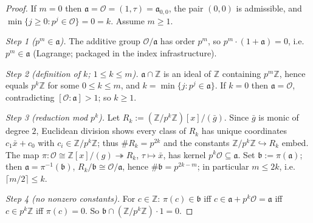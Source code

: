 \begin{proof}
  If $m = 0$ then $\mathfrak{a} = \mathcal{O} = (1, \tau) = \mathfrak{a}_{0,0}$,
  the pair $(0, 0)$ is admissible, and
  $\min\{j \ge 0 : p^j \in \mathcal{O}\} = 0 = k$. Assume $m \ge 1$.

  \emph{Step 1 ($p^m \in \mathfrak{a}$).} The additive group
  $\mathcal{O}/\mathfrak{a}$ has order $p^m$, so $p^m\cdot(1 + \mathfrak{a}) = 0$,
  i.e.\ $p^m \in \mathfrak{a}$ (Lagrange; packaged in the index infrastructure).

  \emph{Step 2 (definition of $k$; $1 \le k \le m$).}
  $\mathfrak{a} \cap \mathbb{Z}$ is an ideal of $\mathbb{Z}$ containing
  $p^m\mathbb{Z}$, hence equals $p^k\mathbb{Z}$ for some $0 \le k \le m$, and
  $k = \min\{j : p^j \in \mathfrak{a}\}$. If $k = 0$ then $\mathfrak{a} = \mathcal{O}$,
  contradicting $[\mathcal{O}:\mathfrak{a}] > 1$; so $k \ge 1$.

  \emph{Step 3 (reduction mod $p^k$).} Let
  $R_k := (\mathbb{Z}/p^k\mathbb{Z})[x]/(\bar g)$. Since $\bar g$ is monic of
  degree $2$, Euclidean division shows every class of $R_k$ has unique coordinates
  $c_1\bar x + c_0$ with $c_i \in \mathbb{Z}/p^k\mathbb{Z}$; thus
  $\# R_k = p^{2k}$ and the constants $\mathbb{Z}/p^k\mathbb{Z} \hookrightarrow R_k$
  embed. The map $\pi : \mathcal{O} \cong \mathbb{Z}[x]/(g) \twoheadrightarrow R_k$,
  $\tau \mapsto \bar x$, has kernel $p^k\mathcal{O} \subseteq \mathfrak{a}$. Set
  $\mathfrak{b} := \pi(\mathfrak{a})$; then $\mathfrak{a} = \pi^{-1}(\mathfrak{b})$,
  $R_k/\mathfrak{b} \cong \mathcal{O}/\mathfrak{a}$, hence
  $\#\mathfrak{b} = p^{2k-m}$; in particular $m \le 2k$, i.e.\ $\lceil m/2\rceil \le k$.

  \emph{Step 4 (no nonzero constants).} For $c \in \mathbb{Z}$:
  $\pi(c) \in \mathfrak{b}$ iff $c \in \mathfrak{a} + p^k\mathcal{O} = \mathfrak{a}$
  iff $c \in p^k\mathbb{Z}$ iff $\pi(c) = 0$. So
  $\mathfrak{b} \cap (\mathbb{Z}/p^k\mathbb{Z})\cdot 1 = 0$.


\end{proof}
